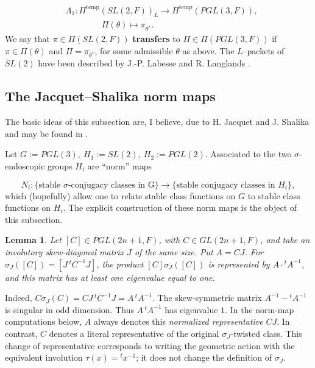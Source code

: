 \documentclass[12pt,letterpaper]{amsart}
\numberwithin{equation}{section}
\newtheorem{lemma}[theorem]{Lemma}
\theoremstyle{definition}
\theoremstyle{plain}
\begin{document}
\begin{equation}
\label{eqn:1.8}
\begin{split}
&\Lambda_1 : \Pi^{\text{temp}}(SL(2,F))_L \rightarrow 
\Pi^{\text{temp}}(PGL(3,F)),\\
&\quad\quad \ \ \ \ \ \ \ \ \ \ \Pi (\theta ) \longmapsto \pi_{\theta^*}.
\end{split} 
\end{equation}
We say that $\pi \in \Pi (SL(2,F))$ {\bf transfers} to 
$\Pi \in \Pi (PGL(3,F))$ if $\pi \in \Pi (\theta )$ and 
$\Pi = \pi_{\theta^*}$, for some admissible $\theta$ as above. 
The $L$--packets of $SL(2)$ have been described by J.-P. Labesse
and R. Langlands \cite{LL79}.

\subsection{The Jacquet--Shalika norm maps}
\label{sec:1.3}

The basic ideas of this subsection are, I believe, due to H. Jacquet
and J. Shalika and may be found in \cite{LaUn}.
 
Let $G := PGL(3),\ H_1 := SL(2),\ H_2 := PGL(2)$.
Associated to the two $\sigma$-endoscopic groups $H_i$ are ``norm'' maps

\begin{equation}
\label{eqn:1.9}
N_i : \{\text{stable $\sigma$-conjugacy classes in G}\} \rightarrow
\{\text{stable conjugacy classes in $H_i$}\},
\end{equation}
which (hopefully) allow one to relate stable class functions on $G$ to stable
class functions on $H_i$. The explicit construction of these norm maps
is the object of this subsection.

\begin{lemma}
\label{lemma:1.10}
Let $[C]\in PGL(2n+1,F)$, with $C\in GL(2n+1,F)$, and take an
involutory skew-diagonal matrix $J$ of the same size. Put $A=CJ$.
For $\sigma_J([C])=[J\,{}^tC^{-1}J]$, the product
$[C]\sigma_J([C])$ is represented by
$A\cdot{}^tA^{-1}$, and this matrix has at least one
 eigenvalue equal to one.
\end{lemma}
 
Indeed, $C\sigma_J(C)=CJ\,{}^tC^{-1}J=A\,{}^tA^{-1}$.
The skew-symmetric matrix $A^{-1}-{}^tA^{-1}$ is singular
in odd dimension. Thus $A\,{}^tA^{-1}$ has eigenvalue $1$.
In the norm-map computations below, $A$ always denotes this
\emph{normalized representative} $CJ$. In contrast, $C$ denotes a
literal representative of the original $\sigma_J$-twisted class.
This change of representative corresponds to writing the geometric
action with the equivalent involution $\tau(x)={}^tx^{-1}$; it does
not change the definition of $\sigma_J$.
 
\end{document}
